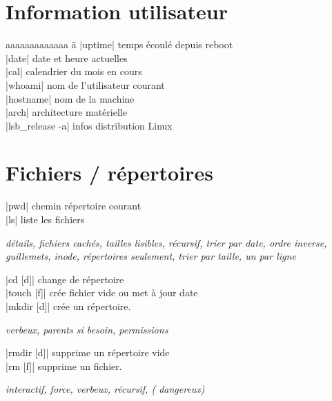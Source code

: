 \documentclass{article}
\newenvironment{cmdblock}{%
  \par\setlength{\parindent}{0pt}\setlength{\parskip}{0pt}%
  \RaggedRight%
}{\par}
\newlength{\cmdoptindent}
\newcommand{\cmdopt}[1]{%
  \hspace*{\cmdoptindent}%
  \begin{minipage}[t]{\dimexpr\linewidth-\cmdoptindent\relax}
    \RaggedRight \itshape #1%
  \end{minipage}\par
}
\begin{document}
\begin{multicols}{4}
    \section*{Information utilisateur}
    \begin{tabbing}
        aaaaaaaaaaaaa \= a \kill
        \code|uptime| \> temps écoulé depuis reboot \\
        \code|date| \> date et heure actuelles \\
        \code|cal| \> calendrier du mois en cours \\
        \code|whoami| \> nom de l'utilisateur courant \\
        \code|hostname| \> nom de la machine \\
        \code|arch| \> architecture matérielle \\
        \code|lsb_release -a| \> infos distribution Linux \\
    \end{tabbing}

    \section*{Fichiers / répertoires}

    \begin{cmdblock}
        \code|pwd| \quad chemin répertoire courant \\
        \code|ls| \quad liste les fichiers \\
        \cmdopt{ détails,  fichiers cachés,
            \codx{-h} tailles lisibles, \codx{-R} récursif,
            \codx{-t} trier par date, \codx{-r} ordre inverse,
            \codx{-Q} guillemets, \codx{-i} inode,
            \codx{-d} répertoires seulement, \codx{-S} trier par taille,
            \codx{-1} un par ligne}
        \code|cd [d]| \quad change de répertoire \\
        \code|touch [f]| \quad crée fichier vide ou met à jour date \\
        \code|mkdir [d]| \quad crée un répertoire. \\
        \cmdopt{ verbeux,
         parents si besoin,
        \codx{-m [perms]} permissions}
        \code|rmdir [d]| \quad supprime un répertoire vide \\
        \code|rm [f]| \quad supprime un fichier. \\
        \cmdopt{ interactif,
             force,
            \codx{-v} verbeux,
            \codx{-r} récursif, (\codx{rm -rf} dangereux)}


\end{cmdblock}
\end{multicols}
\end{document}
